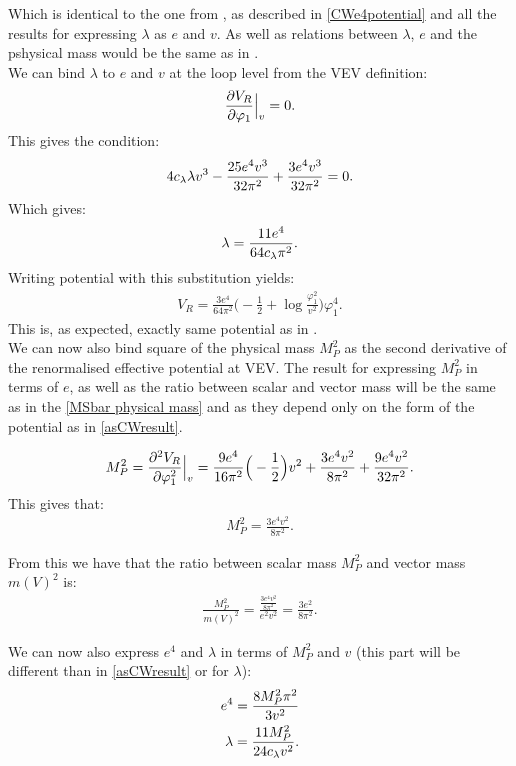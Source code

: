 Which is identical to the one from \citeColWein, as described in \ref{CWe4potential} and all the 
results for expressing $\lambda$ as $e$ and $v$. As well as relations between $\lambda$, $e$ and 
the pshysical mass would be the same as in \citeColWein. \\
We can bind $\lambda$ to $e$ and $v$ at the loop level from the VEV definition:
\begin{align}
\frac{\partial V_R}{\partial \varphi_1} \Big|_v= 0.
\end{align}
This gives the condition:
\begin{align}
4c_\lambda\lambda v^3-\frac{25e^4v^3}{32\pi^2}+\frac{3e^4v^3}{32\pi^2}=0.
\end{align}
Which gives:
\begin{align}\label{e4_lambda_MS}
\lambda = \frac{11e^4}{64c_\lambda\pi^2}.
\end{align}
Writing potential with this substitution yields:
\begin{align}\label{asCWresult}
V_R = \frac{3e^4}{64\pi^2}\Big(-\frac{1}{2}+\log\frac{\varphi_1^2}{v^2}\Big)\varphi_1^4.
\end{align}
This is, as expected, exactly same potential as in \citeColWein. \\
We can now also bind square of the physical mass $M_P^2$ as the second derivative of the 
renormalised effective potential at VEV. The result for expressing $M_P^2$ in terms 
of $e$, as well as the ratio between scalar and vector mass will be the same as in the 
\ref{MSbar physical mass} and \citeColWein as they depend only on the form 
of the potential as in \ref{asCWresult}. 

\begin{align}
M_P^2 = \frac{\partial^2 V_R}{\partial \varphi_1^2} \Big|_v = \frac{9e^4}{16\pi^2}\Big(-\frac{1}{2}\Big)v^2+\frac{3e^4v^2}{8\pi^2} 
+\frac{9e^4v^2}{32\pi^2}.
\end{align}
This gives that:
\begin{align}
M_P^2 = \frac{3e^4v^2}{8\pi^2}.
\end{align}

From this we have that the ratio between scalar mass $M_P^2$ and vector mass $m(V)^2$ is:
\begin{align}
\frac{M_P^2}{m(V)^2} = \frac{\frac{3e^4v^2}{8\pi^2}}{e^2v^2} = \frac{3e^2}{8\pi^2}.
\end{align}

We can now also express $e^4$ and $\lambda$ in terms of $M_P^2$ and $v$ (this part will 
be different than in \ref{asCWresult} or \citeColWein for $\lambda$):
\begin{align}
e^4 = \frac{8M_P^2\pi^2}{3v^2} \\
\lambda = \frac{11M_P^2}{24c_\lambda v^2}.
\end{align}

